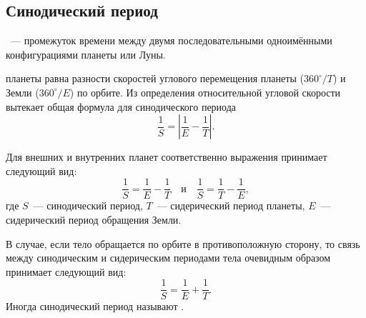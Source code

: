 \subsection{Синодический период}

~--- промежуток времени между двумя 
последовательными одноимёнными конфигурациями планеты или Луны.

 планеты равна 
разности скоростей углового перемещения планеты ($360^\circ/T$) и Земли ($360^\circ/E$) по 
орбите. Из определения относительной угловой скорости вытекает общая формула 
для синодического периода 
\begin{equation}
\frac1S=\left| \frac1E-\frac1T \right|.
\end{equation}

Для внешних и внутренних планет соответственно выражения принимает следующий вид: 
\begin{equation} \frac{1}{S} = \frac{1}{E} - \frac{1}{T} \quad \text{и} \quad \frac{1}{S} = \frac{1}{T} - \frac{1}{E},
\end{equation}
где $S$~--- синодический период, $T$~--- сидерический период планеты, $E$~--- 
сидерический период обращения Земли.

В случае, если тело обращается по орбите в противоположную сторону, то связь 
между синодическим и сидерическим периодами тела очевидным образом принимает следующий вид:
\begin{equation}
\frac1S=\frac1E+\frac1T.
\end{equation}
Иногда синодический период называют . 
